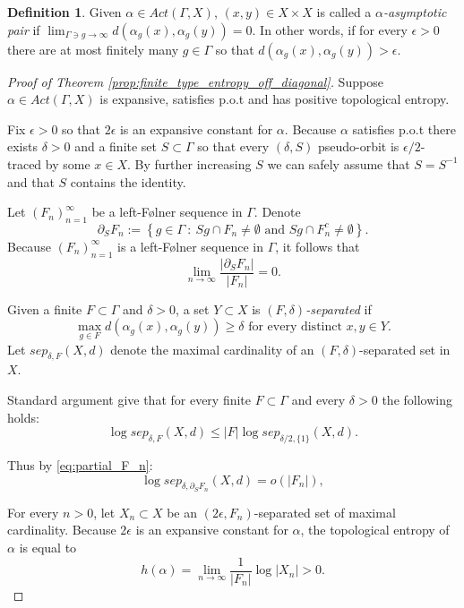 \documentclass[oneside,english]{amsart}
\theoremstyle{definition}
\newtheorem{defn}[thm]{Definition}
\newcommand{\act}[2]{{#1} \curvearrowright {#2}}
\newcommand{\Act}[2]{\mathit{Act}({#1},{#2})}
\newcommand{\sep}{\mathit{sep}}
\begin{document}
\begin{defn}
Given $\alpha \in \Act{\Gamma}{X}$,
 $(x,y) \in X \times X$ is called a \emph{$\alpha$-asymptotic pair} if $\lim_{\Gamma \ni g \to \infty}d(\alpha_g(x),\alpha_g(y))=0$. In other words, if for every $\epsilon>0$ there are at most finitely many  $g \in \Gamma$ so that $d(\alpha_g(x),\alpha_g(y)) >  \epsilon$.
\end{defn}

\begin{proof}[Proof of Theorem \ref{prop:finite_type_entropy_off_diagonal}]
Suppose  $\alpha \in \Act{\Gamma}{X}$  is expansive, satisfies p.o.t and has positive topological entropy.

Fix  $\epsilon >0$ so that $2\epsilon$ is an expansive constant for $\alpha$. Because $\alpha$ satisfies p.o.t there exists $\delta >0$ and a finite set $S \subset \Gamma$ so that every $(\delta,S)$ pseudo-orbit is $\epsilon/2$-traced by some $x \in X$. By further increasing $S$ we can safely assume that $S=S^{-1}$ and that $S$ contains the identity.


Let
$(F_n)_{n=1}^\infty$ be a left-F{\o}lner sequence in $\Gamma$. Denote
$$\partial_S F_n:= \left\{ g \in \Gamma~:~ Sg \cap F_n \ne \emptyset \mbox{ and } Sg \cap F_n^c \ne \emptyset\right\}.$$
Because $(F_n)_{n=1}^\infty$ is a left-F{\o}lner sequence in $\Gamma$, it follows that
\begin{equation}\label{eq:partial_F_n}
\lim_{n \to \infty}\frac{|\partial_S F_n|}{|F_n|} = 0.
\end{equation}


Given a finite $F \subset \Gamma$ and $\delta >0$, a set $Y \subset X$ is  \emph{$(F,\delta)$-separated} if
$$\max_{g\in F}d(\alpha_g(x),\alpha_g(y)) \ge \delta \mbox{ for every distinct } x,y \in Y.$$
Let $\sep_{\delta,F}(X,d)$ denote the maximal cardinality of an $(F,\delta)$-separated set in $X$.

Standard argument give that for every finite $F \subset \Gamma$ and every $\delta>0$ the following holds:
$$ \log \sep_{\delta,F}(X,d) \le |F| \log \sep_{\delta/2,\{1\}}(X,d).$$

Thus by \eqref{eq:partial_F_n}:
\begin{equation}\label{eq:sep_bd_small_o}
\log \sep_{\delta,\partial_S F_n}(X,d) = o(|F_n|),
\end{equation}

For every $n >0$, let $X_n \subset X$ be an $(2\epsilon,F_n)$-separated set of  maximal cardinality.
Because $2\epsilon$ is an expansive constant for $\alpha$, the topological entropy of $\alpha$ is equal to
\begin{equation}\label{eq:h_sep_pos}
h(\alpha) =\lim_{n \to \infty}\frac{1}{|F_n|}\log|X_n| >0.
\end{equation}


\end{proof}
\end{document}
